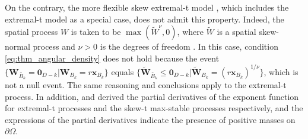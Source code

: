 \documentclass[12pt]{article}
\begin{document}
On the contrary, the more flexible skew extremal-t model \citep{Beranger.etal:2017}, which includes the extremal-t model \citep{Opitz:2013} as a special case, does not admit this property. Indeed, the spatial process $W$ is taken to be $\max(\tilde W^\nu,0)$, where $\tilde W$ is a spatial skew-normal process and $\nu>0$ is the degrees of freedom \citep{Beranger.etal:2017}. In this case, condition \eqref{eq:thm_angular_density} does not hold because the event $\{\bm W_{\bar{B}_k} = \bm 0_{D-k} | \bm W_{B_k} = r \bm x_{B_k} \}$ equals $\{\tilde{\bm W}_{\bar{B}_k} \leq \bm 0_{D-k} | \tilde{\bm W}_{B_k} = (r \bm x_{B_k})^{1/\nu} \}$, which is not a null event. The same reasoning and conclusions apply to the extremal-t process. In addition, \cite{Thibaud.Opitz:2015} and \cite{Beranger.etal:2021} derived the partial derivatives of the exponent function for extremal-t processes and the skew-t max-stable processes respectively, and the expressions of the partial derivatives indicate the presence of positive masses on $\partial\Omega$. 
\end{document}
